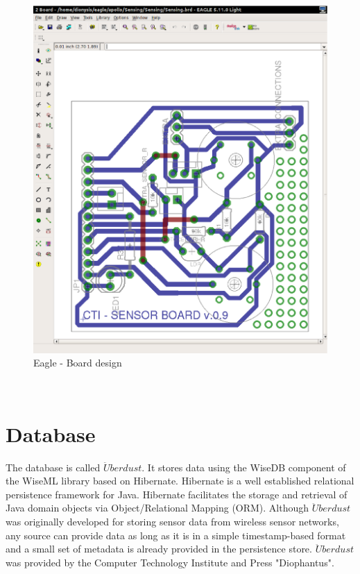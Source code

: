 \documentclass[12pt,a4paper]{report}
\begin{document}
\begin{figure}[H]
\centering
	\includegraphics*[scale=0.25]{eagle2}
    \caption{Eagle - Board design}
\end{figure}
\ \\
\section{Database}
The database is called $\ddot{U}berdust$. It stores data using the WiseDB component of the WiseML library based on Hibernate. Hibernate is a well established relational persistence framework for Java. Hibernate facilitates the storage and retrieval of Java domain objects via Object/Relational Mapping (ORM). Although $\ddot{U}berdust$ was originally developed for storing sensor data from wireless sensor networks, any source can provide data as long as it is in a simple timestamp-based format and a small set of metadata is already provided in the persistence store. $\ddot{U}berdust$ was provided by the Computer Technology Institute and Press "Diophantus". \cite{website:database} \\
%
%
%
\newpage
%
\end{document}
